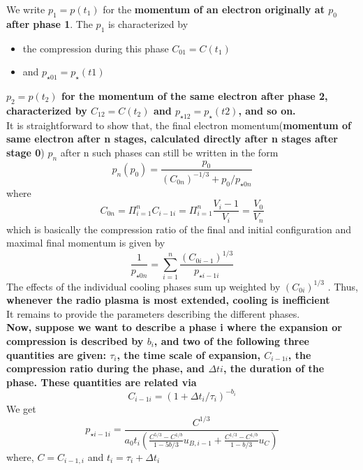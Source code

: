 \documentclass[11pt]{report}
\newcommand{\tbf}[1]{\textbf{#1}}
\newcommand{\cc}[1]{\left({#1}\right)}
\begin{document}
 We write $ p_1 = p(t_1)$ for the \tbf{momentum of an electron originally at $p_0$ after phase 1}. The $p_1$ is characterized by
\begin{itemize}
\item the compression during this phase $C_{0 1} = C(t_1)$
\item and $p_{\star 0 1} = p_\star(t1)$
\end{itemize} 
   \tbf{$p_2=p(t_2)$ for the momentum of the same electron after phase 2, characterized by $C_{1 2}=C(t_2)$ and $p_{\star1 2}=p_\star(t2)$, and so on.}\\
 It is straightforward to show that, the final electron momentum(\tbf{momentum of same electron after n stages, calculated directly after n stages after stage 0}) $p_n$ after n such phases can still be written in the form
 \begin{equation}
 p_n(p_0)=\frac{p_0}{(C_{0n})^{-1/3}+p_0/p_{\star 0n}}
 \end{equation}
 where 
 \begin{equation}
 C_{0n}=\Pi_{i=1} ^nC_{i-1i}=\Pi^n _{i=1}\frac{V_i-1}{V_i}=\frac{V_0}{V_n}
 \end{equation}
which is basically the compression ratio of the final and initial configuration and maximal final momentum is given by
\begin{equation}
\frac{1}{p_{\star 0n}}=\sum^n _{i=1}\frac{(C_{0i-1})^{1/3}}{p_{\star i-1 i}}
\end{equation}
The effects of the individual cooling phases sum up weighted by $(C_{0 i}) ^{1/3}$ . Thus, \textbf{whenever the radio plasma is most extended, cooling is inefficient}\\
It remains to provide the parameters describing the different phases.\\ \tbf{Now, suppose we want to describe a phase i where the expansion or compression is described by $b_i$, and two of the following three quantities are given: $\tau_i$, the time scale of expansion, $C_{i-1i}$, the compression ratio during the phase, and $\Delta ti$, the duration of the phase. These quantities are related via }
\begin{equation}\label{eqCi}
C_{i-1i}=(1+\Delta t_i/\tau_i)^{-b_i}
\end{equation}
We get
\begin{equation}\label{eqpdisi}
p_{\star i-1i}=\frac{C^{1/3}}{a_0t_i\cc{\frac{C^{5/3}-C^{1/b}}{1-5b/3} u_{B,i-1}+\frac{C^{1/3}-C^{1/b}}{1-b/3} u_{C}}}
\end{equation}
where, $C=C_{i-1,i}$ and $t_i=\tau_i+\Delta t_i$\\
\end{document}
